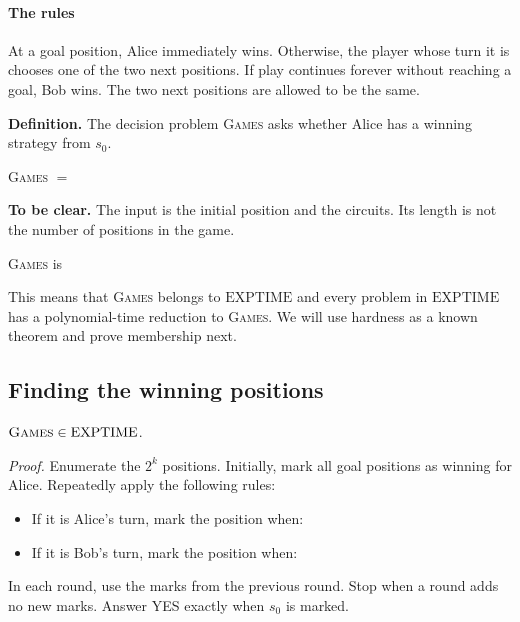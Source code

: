 \documentclass[11  pt]{article}
\begin{document}
\paragraph{The rules}
At a goal position, Alice immediately wins. Otherwise, the player whose turn it is chooses one of the two next positions. If play continues forever without reaching a goal, Bob wins. The two next positions are allowed to be the same.

\textbf{Definition.} The decision problem \textsc{Games} asks whether Alice has a winning strategy from $s_0$.
\begin{center}
    \textsc{Games} $=\phantom{\{\langle s_0,O,G,N_0,N_1\rangle:\text{Alice has a winning strategy}\}}$
\end{center}

\textbf{To be clear.} The input is the initial position and the circuits. Its length is not the number of positions in the game.

\begin{theorem}
    \textsc{Games} is 
\end{theorem}
This means that \textsc{Games} belongs to $\mathrm{EXPTIME}$ and every problem in $\mathrm{EXPTIME}$ has a polynomial-time reduction to \textsc{Games}. We will use hardness as a known theorem and prove membership next.

\newpage
\subsection*{Finding the winning positions}
\begin{theorem}
    $\textsc{Games}\in\mathrm{EXPTIME}$.
\end{theorem}

\textit{Proof.} Enumerate the $2^k$ positions. Initially, mark all goal positions as winning for Alice. Repeatedly apply the following rules:
\begin{itemize}
    \item If it is Alice's turn, mark the position when: 
    \vs{.5cm}
    \item If it is Bob's turn, mark the position when:
		\vs{.5cm}
\end{itemize}
In each round, use the marks from the previous round. Stop when a round adds no new marks. Answer YES exactly when $s_0$ is marked.
\end{document}
